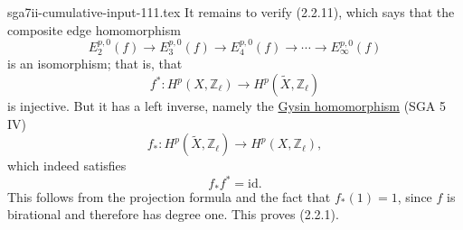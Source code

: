 \begin{filecontents*}{sga7ii-cumulative-input-111.tex}
It remains to verify (2.2.11), which says that the composite edge
homomorphism
\begin{equation}\tag{2.2.15}
E_2^{p,0}(f)\longrightarrow E_3^{p,0}(f)
\longrightarrow E_4^{p,0}(f)\longrightarrow\cdots
\longrightarrow E_\infty^{p,0}(f)
\end{equation}
is an isomorphism; that is, that
\begin{equation}\tag{2.2.16}
f^*:H^p(X,\mathbb Z_\ell)
\longrightarrow H^p(\widetilde X,\mathbb Z_\ell)
\end{equation}
is injective. But it has a left inverse, namely the
\underline{Gysin homomorphism} (SGA 5 IV)
\begin{equation}\tag{2.2.17}
f_*:H^p(\widetilde X,\mathbb Z_\ell)
\longrightarrow H^p(X,\mathbb Z_\ell),
\end{equation}
which indeed satisfies
\begin{equation}\tag{2.2.18}
f_*f^*=\mathrm{id}.
\end{equation}
This follows from the projection formula and the fact that $f_*(1)=1$, since
$f$ is birational and therefore has degree one. This proves (2.2.1).

\end{filecontents*}
